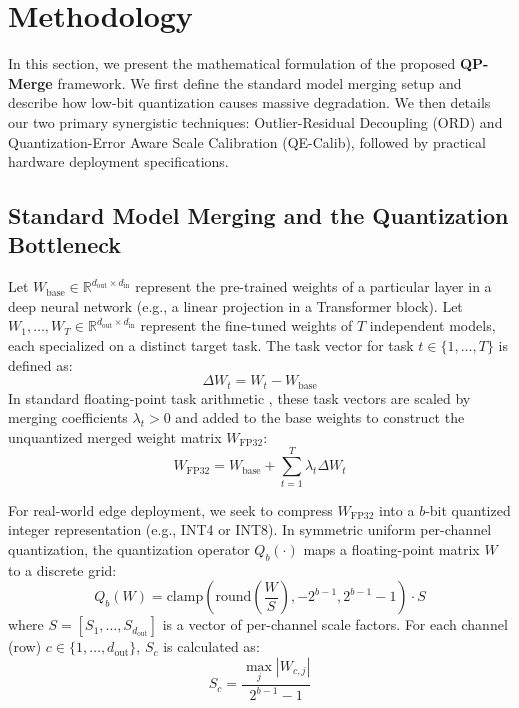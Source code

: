 \section{Methodology}
\label{sec:method}

In this section, we present the mathematical formulation of the proposed \textbf{QP-Merge} framework. We first define the standard model merging setup and describe how low-bit quantization causes massive degradation. We then details our two primary synergistic techniques: Outlier-Residual Decoupling (ORD) and Quantization-Error Aware Scale Calibration (QE-Calib), followed by practical hardware deployment specifications.

\subsection{Standard Model Merging and the Quantization Bottleneck}
Let $W_{\text{base}} \in \mathbb{R}^{d_{\text{out}} \times d_{\text{in}}}$ represent the pre-trained weights of a particular layer in a deep neural network (e.g., a linear projection in a Transformer block). Let $W_1, \dots, W_T \in \mathbb{R}^{d_{\text{out}} \times d_{\text{in}}}$ represent the fine-tuned weights of $T$ independent models, each specialized on a distinct target task. The task vector for task $t \in \{1, \dots, T\}$ is defined as:
\begin{equation}
\Delta W_t = W_t - W_{\text{base}}
\end{equation}
In standard floating-point task arithmetic \cite{ilharco2022editing}, these task vectors are scaled by merging coefficients $\lambda_t > 0$ and added to the base weights to construct the unquantized merged weight matrix $W_{\text{FP32}}$:
\begin{equation}
W_{\text{FP32}} = W_{\text{base}} + \sum_{t=1}^T \lambda_t \Delta W_t
\label{eq:standard_merge}
\end{equation}

For real-world edge deployment, we seek to compress $W_{\text{FP32}}$ into a $b$-bit quantized integer representation (e.g., INT4 or INT8). In symmetric uniform per-channel quantization, the quantization operator $Q_b(\cdot)$ maps a floating-point matrix $W$ to a discrete grid:
\begin{equation}
Q_b(W) = \text{clamp}\left( \text{round}\left( \frac{W}{S} \right), -2^{b-1}, 2^{b-1}-1 \right) \cdot S
\end{equation}
where $S = [S_1, \dots, S_{d_{\text{out}}}]$ is a vector of per-channel scale factors. For each channel (row) $c \in \{1, \dots, d_{\text{out}}\}$, $S_c$ is calculated as:
\begin{equation}
S_c = \frac{\max_{j} |W_{c,j}|}{2^{b-1}-1}
\label{eq:scale}
\end{equation}

